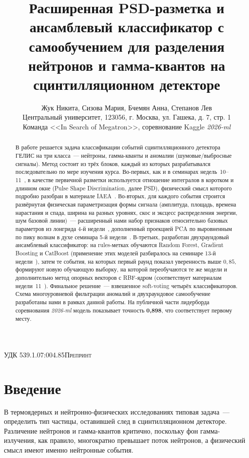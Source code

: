 \documentclass[11pt,a4paper]{article}
\title{Расширенная PSD-разметка и ансамблевый классификатор
с самообучением для разделения нейтронов и гамма-квантов
на сцинтилляционном детекторе}
\author{Жук Никита, Сизова Мария, Бчемян Анна, Степанов Лев\\
{\small Центральный университет, 123056, г. Москва, ул. Гашека, д. 7, стр. 1}\\
{\small Команда <<In Search of Megatron>>, соревнование Kaggle \emph{2026-ml}}}
\date{}
\begin{document}
\thispagestyle{fancy}
\noindent\textsc{УДК 539.1.07:004.85}\hfill\textsc{Препринт}
\vspace{0.5em}
\maketitle

\begin{abstract}
В работе решается задача классификации событий сцинтилляционного
детектора ГЕЛИС на три класса~--- нейтроны, гамма-кванты и аномалии
(шумовые/выбросные сигналы). Метод состоит из трёх блоков, каждый
из которых разрабатывался последовательно по мере изучения курса.
Во-первых, как и в семинарах недель~10--11~\cite{lr10,lr11}, в качестве
первичной разметки используется отношение интегралов в коротком и
длинном окне (Pulse Shape Discrimination, далее PSD), физический
смысл которого подробно разобран в материале IAEA~\cite{iaea}.
Во-вторых, для каждого события строится развёрнутая физическая
параметризация формы сигнала (амплитуда, площадь, времена нарастания
и спада, ширина на разных уровнях, скос и эксцесс распределения
энергии, шум базовой линии)~--- расширенный нами набор признаков
относительно базовых параметров из лонгрида 4-й недели~\cite{lr4},
дополненный проекцией PCA по выровненным по пику волнам в духе
семинара 5-й недели~\cite{lr5}.
В-третьих, разработан двухраундовый ансамблевый классификатор:
на rules-метках обучаются Random Forest, Gradient Boosting и
CatBoost (применение этих моделей разбиралось на семинаре 13-й
недели~\cite{lr13}), затем те события, на которых первый раунд показал
уверенность выше $0{,}85$, формируют новую обучающую выборку, на
которой переобучаются те же модели и дополнительно метод опорных
векторов с RBF-ядром (соответствует материалам недели~11~\cite{lr11}).
Финальное решение~--- взвешенное soft-voting четырёх классификаторов.
Схема многоуровневой фильтрации аномалий и двухраундовое
самообучение разработаны нами в рамках данной работы.
На публичной части лидерборда соревнования \emph{2026-ml} модель
показывает точность \textbf{0,898}, что соответствует первому месту.
\end{abstract}

\section{Введение}

В термоядерных и нейтронно-физических исследованиях типовая задача~---
определить тип частицы, оставившей след в сцинтилляционном детекторе.
Различение нейтронов и гамма-квантов критично, поскольку фон
гамма-излучения, как правило, многократно превышает поток нейтронов,
а физический смысл имеют именно нейтронные события.
\end{document}
